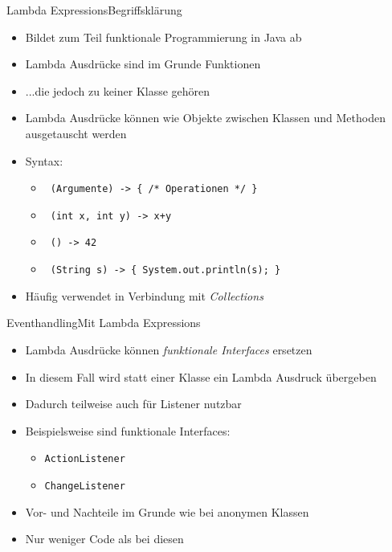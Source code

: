 \begin{frame}{Lambda Expressions}{Begriffsklärung}
    \begin{itemize}
        \item Bildet zum Teil funktionale Programmierung in Java ab
        \item Lambda Ausdrücke sind im Grunde Funktionen
        \item ...die jedoch zu keiner Klasse gehören
        \item Lambda Ausdrücke können wie Objekte zwischen Klassen und Methoden ausgetauscht werden
        \item Syntax:
        \begin{itemize}
            \item \texttt{ (Argumente) -> \{ /* Operationen */ \}}
            \item \texttt{ (int x, int y) -> x+y}
            \item \texttt{ () -> 42 }
            \item \texttt{ (String s) -> \{ System.out.println(s); \}}
        \end{itemize}
        \item Häufig verwendet in Verbindung mit \textit{Collections}
    \end{itemize}
\end{frame}

\begin{frame}{Eventhandling}{Mit Lambda Expressions}
    \begin{itemize}
        \item Lambda Ausdrücke können \textit{funktionale Interfaces} ersetzen
        \item In diesem Fall wird statt einer Klasse ein Lambda Ausdruck übergeben
        \item Dadurch teilweise auch für Listener nutzbar
        \item Beispielsweise sind funktionale Interfaces:
        \begin{itemize}
            \item \texttt{ActionListener}
            \item \texttt{ChangeListener}
        \end{itemize}
        \item Vor- und Nachteile im Grunde wie bei anonymen Klassen
        \item Nur weniger Code als bei diesen
    \end{itemize}
\end{frame}

